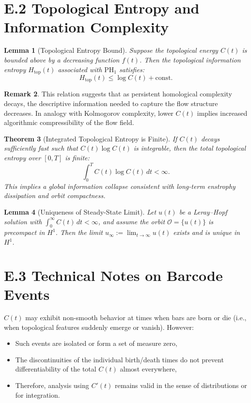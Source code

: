 \documentclass[11pt]{article}
\newtheorem{theorem}{Theorem}[section]
\newtheorem{lemma}[theorem]{Lemma}
\theoremstyle{definition}
\newtheorem{remark}[theorem]{Remark}
\begin{document}
\section*{E.2 Topological Entropy and Information Complexity}
\begin{lemma}[Topological Entropy Bound]
Suppose the topological energy $C(t)$ is bounded above by a decreasing function $f(t)$. Then the topological information entropy $H_\text{top}(t)$ associated with $\mathrm{PH}_1$ satisfies:
\[
H_\text{top}(t) \leq \log C(t) + \text{const}.
\]
\end{lemma}

\begin{remark}
This relation suggests that as persistent homological complexity decays, the descriptive information needed to capture the flow structure decreases. In analogy with Kolmogorov complexity, lower $C(t)$ implies increased algorithmic compressibility of the flow field.
\end{remark}

\begin{theorem}[Integrated Topological Entropy is Finite]
If $C(t)$ decays sufficiently fast such that $C(t) \log C(t)$ is integrable, then the total topological entropy over $[0,T]$ is finite:
\[
\int_0^T C(t) \log C(t)\, dt < \infty.
\]
This implies a global information collapse consistent with long-term enstrophy dissipation and orbit compactness.
\end{theorem}

\begin{lemma}[Uniqueness of Steady-State Limit]
Let $u(t)$ be a Leray--Hopf solution with $\int_0^\infty C(t)\,dt < \infty$, and assume the orbit $\mathcal{O} = \{u(t)\}$ is precompact in $H^1$. Then the limit $u_\infty := \lim_{t \to \infty} u(t)$ exists and is unique in $H^1$.
\end{lemma}

\section*{E.3 Technical Notes on Barcode Events}
$C(t)$ may exhibit non-smooth behavior at times when bars are born or die (i.e., when topological features suddenly emerge or vanish). However:
\begin{itemize}
  \item Such events are isolated or form a set of measure zero,
  \item The discontinuities of the individual birth/death times do not prevent differentiability of the total $C(t)$ almost everywhere,
  \item Therefore, analysis using $C'(t)$ remains valid in the sense of distributions or for integration.
\end{itemize}
\end{document}
